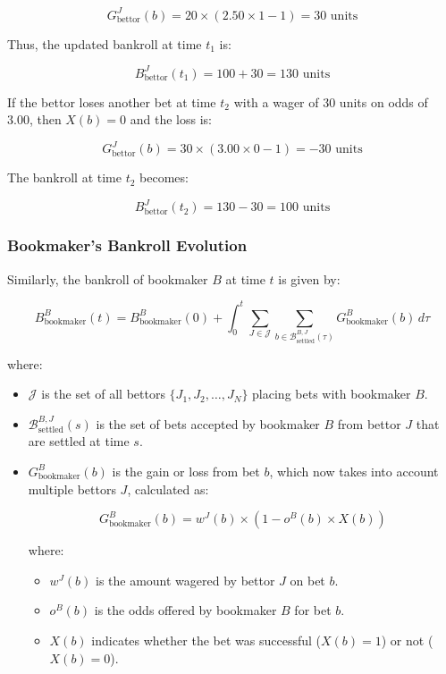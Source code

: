 \[
G_{\text{bettor}}^J(b) = 20 \times (2.50 \times 1 - 1) = 30 \text{ units}
\]

Thus, the updated bankroll at time \( t_1 \) is:

\[
B_{\text{bettor}}^J(t_1) = 100 + 30 = 130 \text{ units}
\]

If the bettor loses another bet at time \( t_2 \) with a wager of 30 units on odds of 3.00, then \( X(b) = 0 \) and the loss is:

\[
G_{\text{bettor}}^J(b) = 30 \times (3.00 \times 0 - 1) = -30 \text{ units}
\]

The bankroll at time \( t_2 \) becomes:

\[
B_{\text{bettor}}^J(t_2) = 130 - 30 = 100 \text{ units}
\]

\subsubsection{Bookmaker's Bankroll Evolution}

Similarly, the bankroll of bookmaker \( B \) at time \( t \) is given by:

\[
B_{\text{bookmaker}}^B(t) = B_{\text{bookmaker}}^B(0) + \int_0^t \sum_{J \in \mathcal{J}} \sum_{b \in \mathcal{B}_{\text{settled}}^{B,J}(\tau)} G_{\text{bookmaker}}^B(b) \, d\tau
\]

where:

\begin{itemize}

    \item \( \mathcal{J} \) is the set of all bettors \( \{ J_1, J_2, \dots, J_N \} \) placing bets with bookmaker \( B \).
    \item \( \mathcal{B}_{\text{settled}}^{B,J}(s) \) is the set of bets accepted by bookmaker \( B \) from bettor \( J \) that are settled at time \( s \).
    \item \( G_{\text{bookmaker}}^B(b) \) is the gain or loss from bet \( b \), which now takes into account multiple bettors \( J \), calculated as:
    
    \[
    G_{\text{bookmaker}}^B(b) = w^{J}(b) \times \left( 1 - o^{B}(b) \times X(b) \right)
    \]
    
    where:
    \begin{itemize}
        \item \( w^{J}(b) \) is the amount wagered by bettor \( J \) on bet \( b \).
        \item \( o^{B}(b) \) is the odds offered by bookmaker \( B \) for bet \( b \).
        \item \( X(b) \) indicates whether the bet was successful (\( X(b) = 1 \)) or not (\( X(b) = 0 \)).
    \end{itemize}
\end{itemize}
